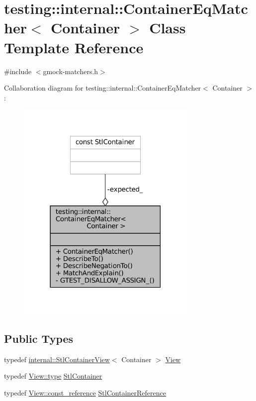 \hypertarget{classtesting_1_1internal_1_1ContainerEqMatcher}{}\section{testing\+:\+:internal\+:\+:Container\+Eq\+Matcher$<$ Container $>$ Class Template Reference}
\label{classtesting_1_1internal_1_1ContainerEqMatcher}


{\ttfamily \#include $<$gmock-\/matchers.\+h$>$}



Collaboration diagram for testing\+:\+:internal\+:\+:Container\+Eq\+Matcher$<$ Container $>$\+:
\nopagebreak
\begin{figure}[H]
\begin{center}
\leavevmode
\includegraphics[width=246pt]{classtesting_1_1internal_1_1ContainerEqMatcher__coll__graph}
\end{center}
\end{figure}
\subsection*{Public Types}
\begin{DoxyCompactItemize}
\item 
typedef \hyperlink{classtesting_1_1internal_1_1StlContainerView}{internal\+::\+Stl\+Container\+View}$<$ Container $>$ \hyperlink{classtesting_1_1internal_1_1ContainerEqMatcher_a1565779cdc3d617fcdc8293f9b53c2a6}{View}
\item 
typedef \hyperlink{classtesting_1_1internal_1_1StlContainerView_a2b2c63a6dcdbfe63fb0ee121ebf463ba}{View\+::type} \hyperlink{classtesting_1_1internal_1_1ContainerEqMatcher_a8352d0190c372578d9a9a8457e0810db}{Stl\+Container}
\item 
typedef \hyperlink{classtesting_1_1internal_1_1StlContainerView_a9cd4f6ed689b3938cdb7b3c4cbf1b36b}{View\+::const\+\_\+reference} \hyperlink{classtesting_1_1internal_1_1ContainerEqMatcher_aaaeaacf0c557fe701a83e108d47edb23}{Stl\+Container\+Reference}
\end{DoxyCompactItemize}

